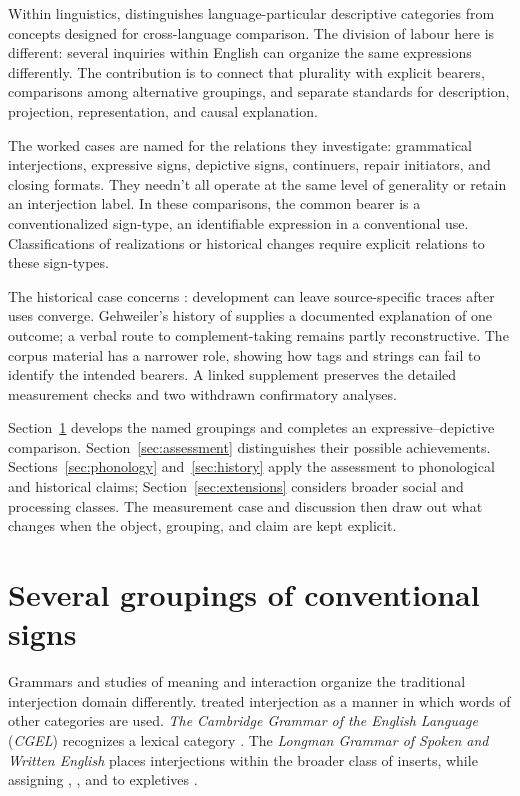 Within linguistics, \textcite[663, 666, 680]{haspelmath2010} distinguishes
language-particular descriptive categories from concepts designed for
cross-language comparison. The division of labour here is different:
several inquiries within English can organize the same expressions
differently. The contribution is to connect that plurality with explicit
bearers, comparisons among alternative groupings, and separate standards
for description, projection, representation, and causal explanation.

The worked cases are named for the relations they investigate: grammatical
interjections, expressive signs, depictive signs, continuers, repair
initiators, and closing formats. They needn't all operate at the same level
of generality or retain an interjection label. In these comparisons, the
common bearer is a conventionalized sign-type, an identifiable expression
in a conventional use. Classifications of realizations or historical
changes require explicit relations to these sign-types.

The historical case concerns : development can leave
source-specific traces after uses converge. Gehweiler's history of
 supplies a documented explanation of one outcome; a verbal
route to complement-taking  remains partly reconstructive.
The corpus material has a narrower role, showing how tags and strings
can fail to identify the intended bearers. A linked supplement preserves
the detailed measurement checks and two withdrawn confirmatory analyses.

Section~\ref{sec:worked} develops the named groupings and completes an
expressive--depictive comparison. Section~\ref{sec:assessment} distinguishes
their possible achievements. Sections~\ref{sec:phonology} and~\ref{sec:history}
apply the assessment to phonological and historical claims;
Section~\ref{sec:extensions} considers broader social and processing
classes. The measurement case and discussion then draw out what changes
when the object, grouping, and claim are kept explicit.

\section{Several groupings of conventional signs}\label{sec:worked}

Grammars and studies of meaning and interaction organize the traditional
interjection domain differently. \textcite[90]{jespersen1924} treated
interjection as a manner in which words of other categories are used.
\textit{The Cambridge Grammar of the English Language} (\textit{CGEL})
recognizes a lexical category \citep[22]{HuddlestonPullum2002}. The
\textit{Longman Grammar of Spoken and Written English} places interjections
within the broader class of inserts, while assigning ,
, and  to expletives
\citep[1082--1083, 1094--1095]{Biber1999}.

